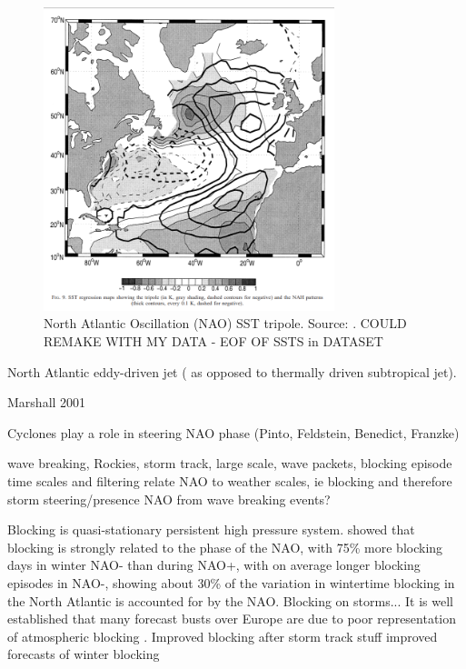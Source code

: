 \begin{figure}[h]
	\centering
	\noindent\includegraphics[width=20pc,angle=0]{czaja_NAH.png}
	\caption{North Atlantic Oscillation (NAO) SST tripole. Source: \citet{czaja2002observed}. COULD REMAKE WITH MY DATA - EOF OF SSTS in DATASET}\label{fig:NAO_SST}
\end{figure}


North Atlantic eddy-driven jet ( as opposed to thermally driven subtropical jet).

Marshall 2001

Cyclones play a role in steering NAO phase (Pinto, Feldstein, Benedict, Franzke)

wave breaking, Rockies, storm track, large scale, wave packets, blocking episode time scales and filtering
relate NAO to weather scales, ie blocking and therefore storm steering/presence
NAO from wave breaking events?

Blocking is quasi-stationary persistent high pressure system. \citet{shabbar2001relationship} showed that blocking is strongly related to the phase of the NAO, with 75\% more blocking days in winter NAO- than during NAO+, with on average longer blocking episodes in NAO-, showing about 30\% of the variation in wintertime blocking in the North Atlantic is accounted for by the NAO. Blocking on storms...
It is well established that many forecast busts over Europe are due to poor representation of atmospheric blocking \cite{rodwell2013characteristics}.
\citep{scaife2011improved} Improved blocking after storm track stuff
\citep{dunstone2016skilful} improved forecasts of winter blocking

